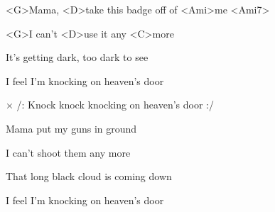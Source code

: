 

\zs
<G>Mama, <D>take this badge off of <Ami>me <Ami7>

<G>I can't <D>use it any <C>more

It's getting dark, too dark to see

I feel I'm knocking on heaven's door
\ks

× /: Knock knock knocking on heaven's door :/
\kr

\zs
Mama put my guns in ground

I can't shoot them any more

That long black cloud is coming down

I feel I'm knocking on heaven's door
\ks


\zr \kr
\kp
